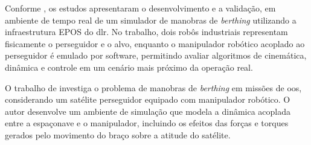 Conforme \cite{nardin2019epos}, os estudos apresentaram o desenvolvimento e a validação, em ambiente de tempo real de um simulador de manobras de \textit{berthing} utilizando a infraestrutura EPOS do \gls{dlr}.
No trabalho, dois robôs industriais representam fisicamente o perseguidor e o alvo, enquanto o manipulador robótico acoplado ao perseguidor é emulado por software, permitindo avaliar algoritmos de cinemática, dinâmica e controle em um cenário mais próximo da operação real.

O trabalho de \cite{nardin2020berthing} investiga o problema de manobras de \textit{berthing} em missões de \gls{oos}, considerando um satélite perseguidor equipado com manipulador robótico.
O autor desenvolve um ambiente de simulação que modela a dinâmica acoplada entre a espaçonave e o manipulador, incluindo os efeitos das forças e torques gerados pelo movimento do braço sobre a atitude do satélite.
